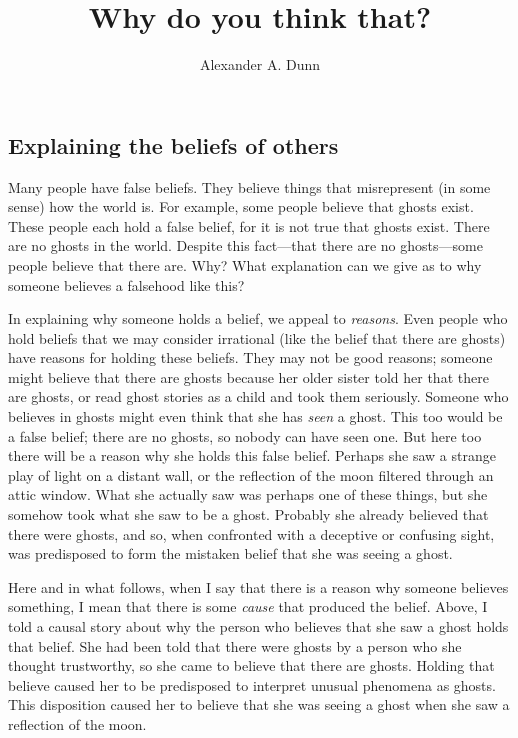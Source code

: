 \documentclass[11pt]{article}
\title{Why do you think that?}
\author{Alexander A. Dunn}
\newenvironment{inq}{\vspace{0pt}%
	\begin{list}{}%
	{\setlength\labelwidth{0pt}%
	\setlength\leftmargin{2.5\oddsidemargin}%
	\setlength\rightmargin{\leftmargin}}
	\begin{spacing}{1}
	\item[]%
	}{
	\end{spacing}
	\end{list}
	\vspace{10pt}
	}
\begin{document}
\ifstandalone
\maketitle
\begin{spacing}{1.5}
\fi


\section{Explaining the beliefs of others}
\label{intro}
\noindent Many people have false beliefs.  They believe things that
misrepresent (in some sense) how the world is.  For example, some
people believe that ghosts exist.  These people each hold a false
belief, for it is not true that ghosts exist.  There are no ghosts in
the world.  Despite this fact---that there are no ghosts---some people
believe that there are.  Why?  What explanation can we give as to why
someone believes a falsehood like this?

In explaining why someone holds a belief, we appeal to {\em reasons}.
Even people who hold beliefs that we may consider irrational (like the
belief that there are ghosts) have reasons for holding these beliefs.
They may not be good reasons; someone might believe that there are
ghosts because her older sister told her that there are ghosts, or
read ghost stories as a child and took them seriously.  Someone who
believes in ghosts might even think that she has {\em seen} a ghost.
This too would be a false belief; there are no ghosts, so nobody can
have seen one.  But here too there will be a reason why she holds this
false belief.  Perhaps she saw a strange play of light on a distant
wall, or the reflection of the moon filtered through an attic window.
What she actually saw was perhaps one of these things, but she somehow
took what she saw to be a ghost.  Probably she already believed that
there were ghosts, and so, when confronted with a deceptive or
confusing sight, was predisposed to form the mistaken belief that she
was seeing a ghost.

Here and in what follows, when I say that there is a reason why
someone believes something, I mean that there is some {\em cause} that
produced the belief.  Above, I told a causal story about why the
person who believes that she saw a ghost holds that belief.  She had
been told that there were ghosts by a person who she thought
trustworthy, so she came to believe that there are ghosts.  Holding
that believe caused her to be predisposed to interpret unusual
phenomena as ghosts.  This disposition caused her to believe that she
was seeing a ghost when she saw a reflection of the moon.


\end{spacing}
\end{document}
